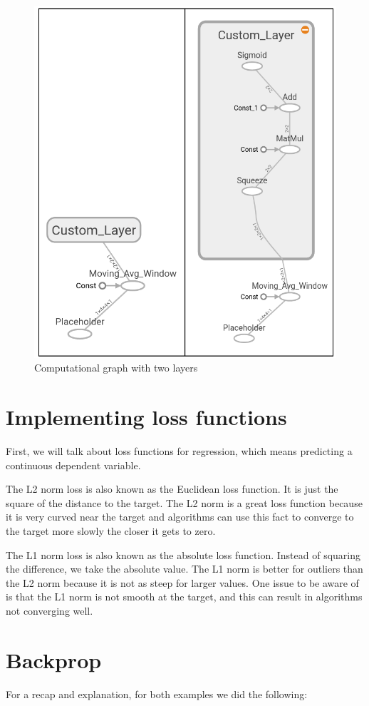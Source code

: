 \documentclass{article}
\begin{document}
\begin{figure}[H]
  \centering
  \includegraphics[width=0.8 \linewidth]{images/03_Multiple_Layers.png}
  \caption{Computational graph with two layers}
\end{figure}


\section{Implementing loss functions}

First, we will talk about loss functions for regression, which means predicting a continuous dependent variable.

The L2 norm loss is also known as the Euclidean loss function. It is just the square of the distance to the target. The L2 norm is a great loss function because it is very curved near the target and algorithms can use this fact to converge to the target more slowly the closer it gets to zero.

The L1 norm loss is also known as the absolute loss function. Instead of squaring the difference, we take the absolute value.  The L1 norm is better for outliers than the L2 norm because it is not as steep for larger values. One issue to be aware of is that the L1 norm is not smooth at the target, and this can result in algorithms not converging well.

\section{Backprop}
For a recap and explanation, for both examples we did the following:
\end{document}
